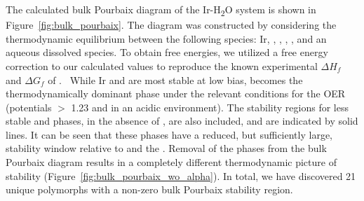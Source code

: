 %
%
The calculated bulk Pourbaix diagram of the Ir-H\textsubscript{2}O system is shown in Figure~\ref{fig:bulk_pourbaix}.
%
The diagram was constructed by considering the thermodynamic equilibrium between the following species: Ir, \rIrOtwo, \aIrOthree, \rIrOthree, \bIrOthree, and an aqueous dissolved  species.
%
%
To obtain free energies, we utilized a free energy correction to our calculated values to reproduce the known experimental $\Delta H_f$ and $\Delta G_f$ of \rIrOtwo.~\cite{Barin1995}
%
While Ir and \rIrOtwo are most stable at low bias, \aIrOthree becomes the thermodynamically dominant phase under the relevant conditions for the OER (potentials $>$ \num{1.23} \VRHE and in an acidic environment).
%
The stability regions for less stable \bIrOthree and \rIrOthree phases,
in the absence of \aIrOthree, are also included,
and are indicated by solid lines.
%
It can be seen that these phases have a reduced, but sufficiently large, stability window relative to \IrOtwo and the .
%
Removal of the \IrOthree phases from the bulk Pourbaix diagram results in a completely different thermodynamic picture of \IrOtwo stability (Figure~\ref{fig:bulk_pourbaix_wo_alpha}).
In total, we have discovered 21 unique \IrOthree polymorphs with a non-zero bulk Pourbaix stability region.
%


